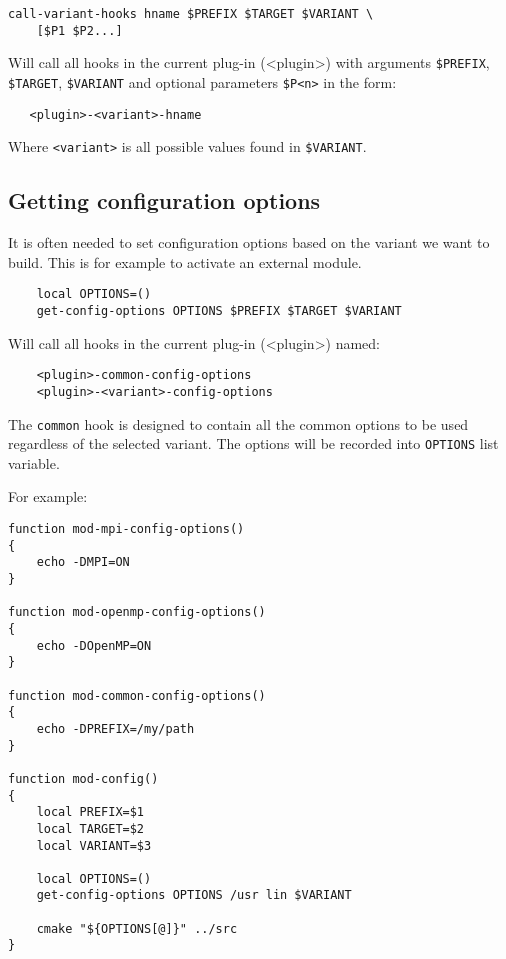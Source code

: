 \documentclass[a4paper,12pt,twoside]{article}
\newcommand{\code}[1]{\texttt{#1}}
\begin{document}
\begin{lstlisting}
call-variant-hooks hname $PREFIX $TARGET $VARIANT \
    [$P1 $P2...]
\end{lstlisting}

Will call all hooks in the current plug-in (<plugin>) with arguments \code{\$PREFIX}, \code{\$TARGET}, \code{\$VARIANT} and optional parameters \code{\$P<n>} in the form:

\begin{lstlisting}
   <plugin>-<variant>-hname
\end{lstlisting}

Where \code{<variant>} is all possible values found in \code{\$VARIANT}.

\subsection{Getting configuration options}
\label{get config options}

It is often needed to set configuration options based on the variant we want to build. This is for example to activate an external module.

\begin{lstlisting}
	local OPTIONS=()
	get-config-options OPTIONS $PREFIX $TARGET $VARIANT
\end{lstlisting}

Will call all hooks in the current plug-in (<plugin>) named:

\begin{lstlisting}
	<plugin>-common-config-options
	<plugin>-<variant>-config-options
\end{lstlisting}

The \code{common} hook is designed to contain all the common options to be used regardless of the selected variant. The options will be recorded into \code{OPTIONS} list variable.

For example:

\begin{lstlisting}
function mod-mpi-config-options()
{
	echo -DMPI=ON
}

function mod-openmp-config-options()
{
	echo -DOpenMP=ON
}

function mod-common-config-options()
{
	echo -DPREFIX=/my/path
}

function mod-config()
{
	local PREFIX=$1
	local TARGET=$2
	local VARIANT=$3

	local OPTIONS=()
	get-config-options OPTIONS /usr lin $VARIANT

	cmake "${OPTIONS[@]}" ../src
}
\end{lstlisting}
\end{document}
